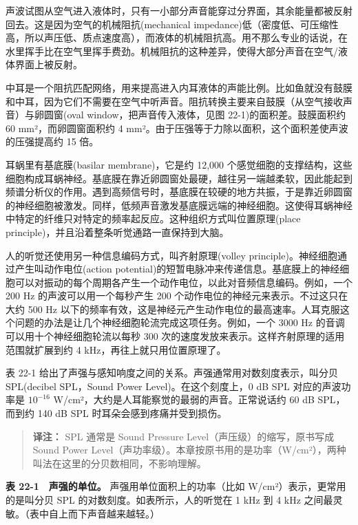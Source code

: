 声波试图从空气进入液体时，只有一小部分声音能穿过分界面，其余能量都被反射回去。这是因为空气的机械阻抗(mechanical
impedance)低（密度低、可压缩性高，所以声压低、质点速度高），而液体的机械阻抗高。用不那么专业的话说，在水里挥手比在空气里挥手费劲。机械阻抗的这种差异，使得大部分声音在空气/液体界面上被反射。

中耳是一个阻抗匹配网络，用来提高进入内耳液体的声能比例。比如鱼就没有鼓膜和中耳，因为它们不需要在空气中听声音。阻抗转换主要来自鼓膜（从空气接收声音）与卵圆窗(oval
window，把声音传入液体，见图 22-1)的面积差。鼓膜面积约 60
mm²，而卵圆窗面积约 4
mm²。由于压强等于力除以面积，这个面积差使声波的压强提高约 15 倍。

耳蜗里有基底膜(basilar membrane)，它是约 12,000
个感觉细胞的支撑结构，这些细胞构成耳蜗神经。基底膜在靠近卵圆窗处最硬，越往另一端越柔软，因此能起到频谱分析仪的作用。遇到高频信号时，基底膜在较硬的地方共振，于是靠近卵圆窗的神经细胞被激发。同样，低频声音激发基底膜远端的神经细胞。这使得耳蜗神经中特定的纤维只对特定的频率起反应。这种组织方式叫位置原理(place
principle)，并且沿着整条听觉通路一直保持到大脑。

人的听觉还使用另一种信息编码方式，叫齐射原理(volley
principle)。神经细胞通过产生叫动作电位(action
potential)的短暂电脉冲来传递信息。基底膜上的神经细胞可以对振动的每个周期各产生一个动作电位，以此对音频信息编码。例如，一个
200 Hz 的声波可以用一个每秒产生 200
个动作电位的神经元来表示。不过这只在大约 500 Hz
以下的频率有效，这是神经元产生动作电位的最高速率。人耳克服这个问题的办法是让几个神经细胞轮流完成这项任务。例如，一个
3000 Hz 的音调可以用十个神经细胞轮流以每秒 300
次的速度发放来表示。这样齐射原理的适用范围就扩展到约 4
kHz，再往上就只用位置原理了。

表 22-1 给出了声强与感知响度之间的关系。声强通常用对数刻度表示，叫分贝
SPL(decibel SPL，Sound Power Level)。在这个刻度上，0 dB SPL
对应的声波功率是 \(10^{-16}\)
W/cm²，大约是人耳能察觉的最弱的声音。正常说话约 60 dB SPL，而到约 140 dB
SPL 时耳朵会感到疼痛并受到损伤。

\begin{quote}
\textbf{译注：} SPL 通常是 Sound Pressure
Level（声压级）的缩写，原书写成 Sound Power
Level（声功率级）。本章按原书用的是功率（W/cm²），两种叫法在这里的分贝数相同，不影响理解。
\end{quote}

\textbf{表 22-1　声强的单位。} 声强用单位面积上的功率（比如
W/cm²）表示，更常用的是叫分贝 SPL 的对数刻度。如表所示，人的听觉在 1 kHz
到 4 kHz 之间最灵敏。（表中自上而下声音越来越轻。）

